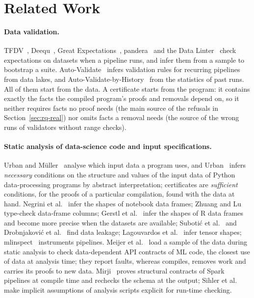 \section{Related Work}\label{sec:related}

\paragraph{Data validation.} TFDV~\cite{breck2019}, Deequ~\cite{schelter2018}, Great
Expectations~\cite{gx}, pandera~\cite{bantilan2020} and the Data Linter~\cite{hynes2017} check
expectations on datasets when a pipeline runs, and infer them from a sample to bootstrap a suite.
Auto-Validate~\cite{song2021} infers validation rules for recurring pipelines from data lakes, and
Auto-Validate-by-History~\cite{tu2023} from the statistics of past runs. All of them start from the
data. A certificate starts from the program: it contains exactly the facts the compiled program's
proofs and removals depend on, so it neither requires facts no proof needs (the main source of the
refusals in Section~\ref{sec:rq-real}) nor omits facts a removal needs (the source of the wrong runs
of validators without range checks).

\paragraph{Static analysis of data-science code and input specifications.} Urban and
M\"uller~\cite{urban2018} analyse which input data a program uses, and Urban~\cite{urban2020} infers
\emph{necessary} conditions on the structure and values of the input data of Python data-processing
programs by abstract interpretation; certificates are \emph{sufficient} conditions, for the proofs
of a particular compilation, found with the data at hand. Negrini et al.~\cite{negrini2023} infer the
shapes of notebook data frames; Zhuang and Lu~\cite{zhuang2022} type-check data-frame columns;
Gerstl et al.~\cite{gerstl2026} infer the shapes of R data frames and become more precise when the
datasets are available; Subotić et al.~\cite{subotic2022} and Drobnjakovi\'c et
al.~\cite{drobnjakovic2022} find data leakage; Lagouvardos et al.~\cite{lagouvardos2020} infer tensor
shapes; mlinspect~\cite{grafberger2022} instruments pipelines. Meijer et al.~\cite{meijer2026} load a
sample of the data during static analysis to check data-dependent API contracts of ML code, the
closest use of data at analysis time; they report faults, whereas \PL compiles, removes work and
carries its proofs to new data. Mirji~\cite{mirji2026} proves structural contracts of Spark pipelines
at compile time and rechecks the schema at the output; Sihler et al.~\cite{sihler2026} make implicit
assumptions of analysis scripts explicit for run-time checking.

